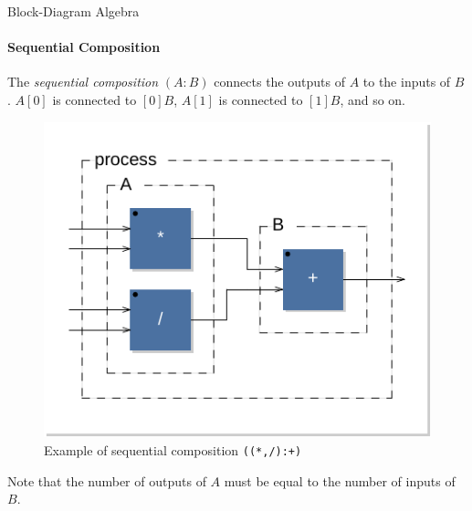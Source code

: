 \begin{frame}[fragile]{Block-Diagram Algebra}
\framesubtitle{Sequential Composition}
The \emph{sequential composition} $(A:B)$ connects the outputs of  $A$ to the inputs of  $B$.  $A[0]$ is connected to $[0]B$,   $A[1]$ is connected to $[1]B$, and so on. 

\begin{figure}[h]
\centering 
\includegraphics[scale=0.5]{images/seq1}
\caption{Example of sequential composition  \lstinline'((*,/):+)' } 
\label{figure:seq1}
\end{figure}

Note that the number of outputs of $A$ must be equal to the number of inputs of $B$.
\end{frame}


